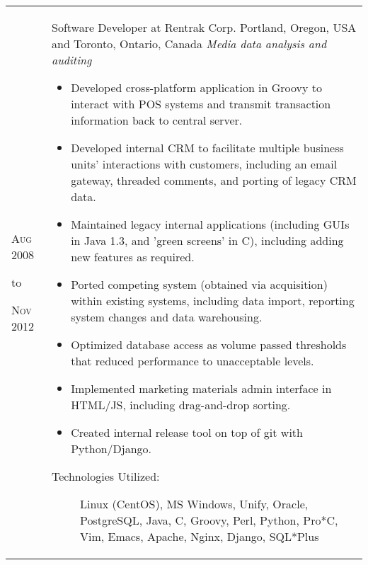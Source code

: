 \documentclass[a4paper,10pt]{article}
\begin{document}
        \begin{tabular}{ R{1.5cm} | p{10.5cm} }
            \hfill \textsc{Aug 2008}\newline
            \begin{center} to \end{center}
            \hfill \textsc{Nov 2012} &

            Software Developer at Rentrak Corp.\newline
            Portland, Oregon, USA and Toronto, Ontario, Canada\newline
            \emph{Media data analysis and auditing} \newline
            \fontsize{9pt}{10pt}\selectfont
            \begin{itemize}
                \item Developed cross-platform application in Groovy to interact with POS
                    systems and transmit transaction information back to central server.
                \item Developed internal CRM to facilitate multiple business units' interactions
                    with customers, including an email gateway, threaded comments, and porting of
                    legacy CRM data.
                \item Maintained legacy internal applications (including GUIs in Java 1.3, and
                    'green screens' in C), including adding new features as required.
                \item Ported competing system (obtained via acquisition) within existing systems,
                    including data import, reporting system changes and data warehousing.
                \item Optimized database access as volume passed thresholds that reduced
                    performance to unacceptable levels.
                \item Implemented marketing materials admin interface in HTML/JS, including
                    drag-and-drop sorting.
                \item Created internal release tool on top of git with Python/Django.
            \end{itemize}
            \bigskip
            \begin{description}
                \item[Technologies Utilized:]
                    Linux (CentOS), MS Windows, Unify, Oracle, PostgreSQL,
                    Java, C, Groovy, Perl, Python, Pro*C, Vim, Emacs, Apache,
                    Nginx, Django, SQL*Plus
            \end{description}
            \\
        \end{tabular}
    
\end{document}
